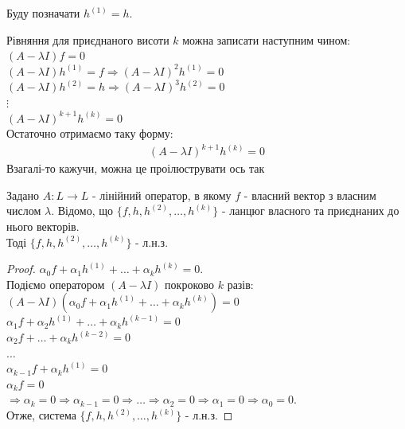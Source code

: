 \begin{remark}
Буду позначати $h^{(1)} = h$.
\end{remark}

\begin{remark}
Рівняння для приєднаного висоти $k$ можна записати наступним чином:\\
$(A-\lambda I)f = 0$\\
$(A-\lambda I)h^{(1)} = f \Rightarrow (A-\lambda I)^2 h^{(1)} = 0$\\
$(A-\lambda I)h^{(2)} = h \Rightarrow (A-\lambda I)^3 h^{(2)} = 0$\\
$\vdots$\\
$(A-\lambda I)^{k+1}h^{(k)} = 0$\\
Остаточно отримаємо таку форму:
\begin{align*}
(A-\lambda I)^{k+1}h^{(k)} = 0
\end{align*}
Взагалі-то кажучи, можна це проілюструвати ось так
\begin{figure}[H]
\centering
{}
\end{figure}
\end{remark}

\begin{theorem}
Задано $A: L \to L$ - лінійний оператор, в якому $f$ - власний вектор з власним числом $\lambda$. Відомо, що $\{f,h,h^{(2)},\dots,h^{(k)}\}$ - ланцюг власного та приєднаних до нього векторів.\\
Тоді $\{f,h,h^{(2)},\dots,h^{(k)}\}$ - л.н.з.
\end{theorem}

\begin{proof}
$\alpha_0 f + \alpha_1 h^{(1)} + \dots + \alpha_k h^{(k)} = 0$.\\
Подіємо оператором $(A-\lambda I)$ покроково $k$ разів:\\
$(A-\lambda I)(\alpha_0 f + \alpha_1 h^{(1)} + \dots + \alpha_k h^{(k)}) = 0$\\
$\alpha_1 f + \alpha_2 h^{(1)} + \dots + \alpha_k h^{(k-1)} = 0$\\
$\alpha_2 f + \dots + \alpha_k h^{(k-2)} = 0$\\
$\dots$\\
$\alpha_{k-1} f + \alpha_k h^{(1)} = 0$\\
$\alpha_k f = 0$\\
$\Rightarrow \alpha_k = 0 \Rightarrow \alpha_{k-1} = 0 \Rightarrow \dots \Rightarrow \alpha_2 = 0 \Rightarrow \alpha_1 = 0 \Rightarrow \alpha_0 = 0$.\\
Отже, система $\{f,h,h^{(2)},\dots,h^{(k)}\}$ - л.н.з.
\end{proof}

